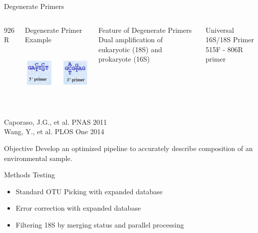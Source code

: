 \documentclass[11pt, xcolor=table]{beamer}
\begin{document}
	\begin{frame}{Degenerate Primers}
	\begin{columns}
	926 R
	
	\begin{block}{Degenerate Primer Example}
	\includegraphics[height=3cm, width=5cm]{CPBS_11_18/primers.jpg}
	\end{block}
	\begin{block}{Feature of Degenerate Primers}
	Dual amplification of eukaryotic (18S) and prokaryote (16S)
	\end{block}
	\begin{block}{Universal 16S/18S Primer}
	515F - 806R primer
	\end{block}
	\end{columns}
	\tiny{Caporaso, J.G., et al. PNAS 2011 \\ Wang, Y., et al. PLOS One 2014}

	\end{frame}
	\begin{frame}{Objective}
	Develop an optimized pipeline to accurately describe composition of an environmental sample.
	\begin{block}{Methods Testing}
	\begin{itemize}
	\item Standard OTU Picking with expanded database
	\item Error correction with expanded database
	\item Filtering 18S by merging status and parallel processing
	\end{itemize}
	\end{block}
	\end{frame}
\end{document}
